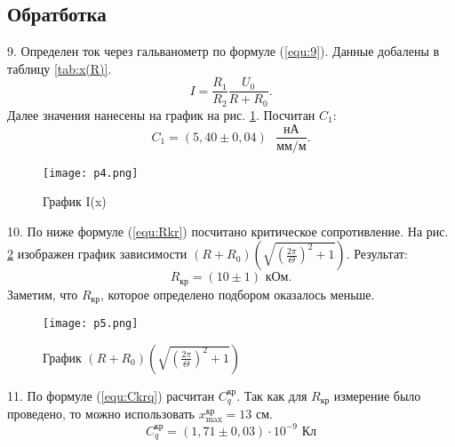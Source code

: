 \subsection{Обратботка}

9. Определен ток через гальванометр по формуле (\ref{equ:9}). Данные добалены в таблицу \ref{tab:x(R)}.
\begin{equation}
    I = \frac{R_1}{R_2}\frac{U_0}{R+R_0}.
    \label{equ:9}
\end{equation}
Далее значения нанесены на график на рис. \ref{pic:p4}. Посчитан $C_1$:
\begin{equation*}
    C_1 = (5,40 \pm 0,04) \text{ } \frac{\text{нА}}{\text{мм/м}}.
\end{equation*}

\begin{figure}[h]
    \centering
    \texttt{[image: p4.png]}
    \caption{График I(x)}
    \label{pic:p4}
\end{figure}

10. По ниже формуле (\ref{equ:Rkr}) посчитано критическое сопротивление. На рис. \ref{pic:p5} изображен график зависимости $(R+R_0)\left(\sqrt{(\frac{2\pi}{\Theta})^2 + 1}\right)$.
Результат:
\begin{equation*}
    R_\text{кр} = (10 \pm 1) \text{ кОм}.
\end{equation*}
Заметим, что $R_\text{кр}$, которое определено подбором оказалось меньше.

\begin{figure}[h]
    \centering
    \texttt{[image: p5.png]}
    \caption{График $(R+R_0)\left(\sqrt{(\frac{2\pi}{\Theta})^2 + 1}\right)$}
    \label{pic:p5}
\end{figure}

11. По формуле (\ref{equ:Ckrq}) расчитан $C_q^\text{кр}$.
Так как для $R_\text{кр}$ измерение было проведено, то можно использовать $x_\text{max}^\text{кр} = 13$ см.
\begin{equation*}
    C_q^\text{кр} = (1,71 \pm 0,03) \cdot 10^{-9}\text{ Кл}
\end{equation*}

